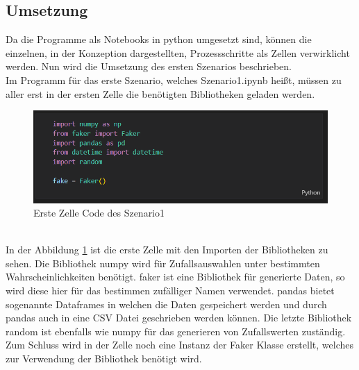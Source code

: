 \begin{onehalfspace}
\section{Umsetzung}
\label{umsetzung}
Da die Programme als Notebooks in python umgesetzt sind, können die einzelnen, in der Konzeption dargestellten, Prozessschritte als Zellen verwirklicht werden. Nun wird die Umsetzung des ersten Szenarios beschrieben.\\
Im Programm für das erste Szenario, welches \glqq{}Szenario1.ipynb\grqq{} heißt, müssen zu aller erst in der ersten Zelle die benötigten Bibliotheken geladen werden.
\begin{figure}[h]
    \centering
    \includegraphics{Diagramme/Sz1_Cell1.PNG}
    \caption{Erste Zelle Code des Szenario1}
    \label{fig:Zelle1S1}
\end{figure}\\
In der Abbildung \ref{fig:Zelle1S1} ist die erste Zelle mit den Importen der Bibliotheken zu sehen. Die Bibliothek \glqq{}numpy\grqq{} wird für Zufallsauswahlen unter bestimmten Wahrscheinlichkeiten benötigt. \glqq{}faker\grqq{} ist eine Bibliothek für generierte Daten, so wird diese hier für das bestimmen zufälliger Namen verwendet. \glqq{}pandas\grqq{} bietet sogenannte Dataframes in welchen die Daten gespeichert werden und durch pandas auch in eine CSV Datei geschrieben werden können. Die letzte Bibliothek \glqq{}random\grqq{} ist ebenfalls wie \glqq{}numpy\grqq{} für das generieren von Zufallswerten zuständig. Zum Schluss wird in der Zelle noch eine Instanz der Faker Klasse erstellt, welches zur Verwendung der Bibliothek benötigt wird.\\

\end{onehalfspace}
